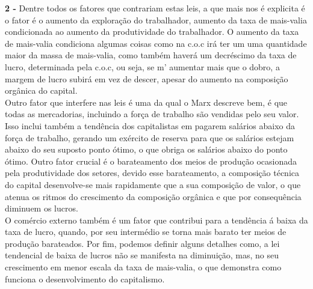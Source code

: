 \documentclass[a4paper, 12pt]{article} %
\begin{document}
\par \textbf{2 -} Dentre todos os fatores que contrariam estas leis, a que mais nos é explicita é o fator é o aumento da exploração do trabalhador, aumento da taxa de mais-valia condicionada ao aumento da produtividade do trabalhador. O aumento da taxa de mais-valia condiciona algumas coisas como na c.o.c irá ter um uma quantidade maior da massa de mais-valia, como também haverá um decréscimo da taxa de lucro, determinada pela c.o.c, ou seja, se m' aumentar mais que o dobro, a margem de lucro subirá em vez de descer, apesar do aumento na composição orgânica do capital.
\\
Outro fator que interfere nas leis é uma da qual o Marx descreve bem, é que todas as mercadorias, incluindo a força de trabalho são vendidas pelo seu valor. Isso inclui também a tendência dos capitalistas em pagarem salários abaixo da força de trabalho, gerando um exército de reserva para que os salários estejam abaixo do seu suposto ponto ótimo, o que obriga os salários abaixo do ponto ótimo. Outro fator crucial é o barateamento dos meios de produção ocasionada pela produtividade dos setores, devido esse barateamento, a composição técnica do capital desenvolve-se mais rapidamente que a sua composição de valor, o que atenua os ritmos do crescimento da composição orgânica e que por consequência diminuem os lucros.
\\
O comércio externo também é um fator que contribui para a tendência á baixa da taxa de lucro, quando, por seu intermédio se torna mais barato ter meios de produção barateados. Por fim, podemos definir alguns detalhes como, a lei tendencial de baixa de lucros  não se manifesta na diminuição, mas, no seu crescimento em menor escala da taxa de mais-valia, o que demonstra como funciona o desenvolvimento do capitalismo.
\end{document}
